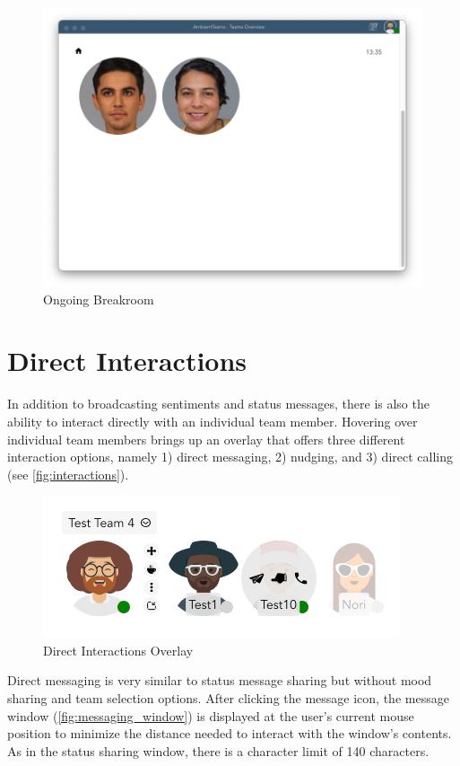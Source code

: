 \begin{figure}[h]
    \centering
    \includegraphics[width=.8\linewidth]{./images/breakroom.png}
    \caption{Ongoing Breakroom}
    \label{fig:breakroom}
\end{figure}

\section{Direct Interactions}
In addition to broadcasting sentiments and status messages, there is also the ability to interact directly with an individual team member. Hovering over individual team members brings up an overlay that offers three different interaction options, namely 1) direct messaging, 2) nudging, and 3) direct calling (see \autoref{fig:interactions}).

\begin{figure}[h]
    \centering
    \includegraphics[width=.4\linewidth]{./images/interactions.png}
    \caption{Direct Interactions Overlay}
    \label{fig:interactions}
\end{figure}

Direct messaging is very similar to status message sharing but without mood sharing and team selection options. After clicking the message icon, the message window (\autoref{fig:messaging_window}) is displayed at the user's current mouse position to minimize the distance needed to interact with the window's contents. As in the status sharing window, there is a character limit of 140 characters.


